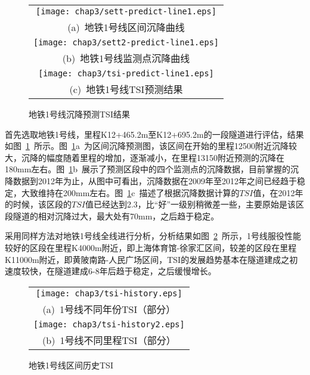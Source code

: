 \begin{figure}[htbp] 
    \centering 
    \begin{tabular}{c} 
        \texttt{[image: chap3/sett-predict-line1.eps]} \\ 
        (a)~地铁1号线区间沉降曲线 \\
        \texttt{[image: chap3/sett2-predict-line1.eps]} \\ 
        (b)~地铁1号线监测点沉降曲线 \\
        \texttt{[image: chap3/tsi-predict-line1.eps]} \\ 
        (c)~地铁1号线TSI预测结果 \\
    \end{tabular}
    \caption{地铁1号线沉降预测TSI结果} 
    \label{fig:地铁1号线沉降预测TSI结果} 
\end{figure}

首先选取地铁1号线，里程K12+465.2m至K12+695.2m的一段隧道进行评估，结果如图~\ref{fig:地铁1号线沉降预测TSI结果}~所示。图~\ref{fig:地铁1号线沉降预测TSI结果}a~为区间沉降预测图，该区间在开始的里程12500附近沉降较大，沉降的幅度随着里程的增加，逐渐减小，在里程13150附近预测的沉降在180mm左右。图~\ref{fig:地铁1号线沉降预测TSI结果}b~展示了预测区段中的四个监测点的沉降数据，目前掌握的沉降数据到2012年为止，从图中可看出，沉降数据在2009年至2012年之间已经趋于稳定，大致维持在200mm左右。图~\ref{fig:地铁1号线沉降预测TSI结果}c~描述了根据沉降数据计算的$TSI$值，在2012年的时候，该区段的$TSI$值已经达到2.3，比“好”一级别稍微差一些，主要原始是该区段隧道的相对沉降过大，最大处有70mm，之后趋于稳定。

采用同样方法对地铁1号线全线进行分析，分析结果如图~\ref{fig:地铁1号线区间历史TSI}~所示，1号线服役性能较好的区段在里程K4000m附近，即上海体育馆-徐家汇区间，较差的区段在里程K11000m附近，即黄陂南路-人民广场区间，TSI的发展趋势基本在隧道建成之初速度较快，在隧道建成6-8年后趋于稳定，之后缓慢增长。

\begin{figure}[htb!] 
    \centering 
    \begin{tabular}{c} 
        \texttt{[image: chap3/tsi-history.eps]} \\ 
        (a)~1号线不同年份TSI（部分） \\
        \texttt{[image: chap3/tsi-history2.eps]} \\ 
        (b)~1号线不同里程TSI（部分） \\
    \end{tabular}
    \caption{地铁1号线区间历史TSI} 
    \label{fig:地铁1号线区间历史TSI} 
\end{figure}

